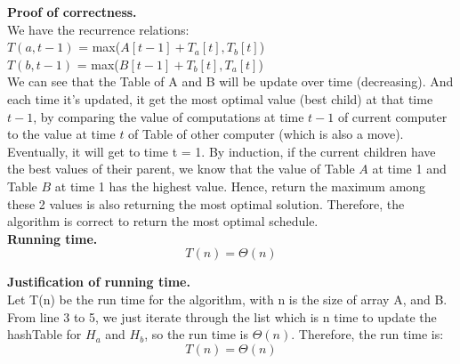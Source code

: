 \documentclass[11pt]{article}
\begin{document}
\noindent
\textbf{Proof of correctness.}\\
We have the recurrence relations:\\
$T(a,t-1)$ = max($A[t-1] + T_a[t], T_b[t]$)\\
$T(b,t-1)$ = max($B[t-1] + T_b[t], T_a[t]$)\\
We can see that the Table of A and B will be update over time (decreasing). And each time it's updated, it get the most optimal value (best child) at that time $t-1$, by comparing the value of computations at time $t-1$ of current computer to the value at time $t$ of Table of other computer (which is also a move). Eventually, it will get to time t = 1. By induction, if the current children have the best values of their parent, we know that the value of Table $A$ at time 1 and Table $B$ at time 1 has the highest value. Hence, return the maximum among these 2 values is also returning the most optimal solution. Therefore, the algorithm is correct to return the most optimal schedule.\\
\noindent
\textbf{Running time.}\\
$$\boxed{T(n) = \Theta(n)}$$

\noindent
\textbf{Justification of running time.}\\
Let T(n) be the run time for the algorithm, with n is the size of array A, and B.\\
From line 3 to 5, we just iterate through the list which is n time to update the hashTable for $H_a$ and $H_b$, so the run time is $\Theta(n)$.
Therefore, the run time is:
$$\boxed{T(n) = \Theta(n)}$$



\newpage
\end{document}
